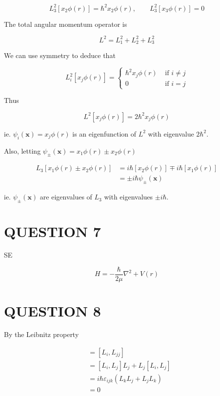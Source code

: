 \documentclass[a4paper]{article}
\begin{document}
\[ L_{3}^{2}[ x_{2} \phi(r) ] = \hbar^{2} x_{2} \phi(r), \qquad L_{3}^{2}[x_{3}\phi(r)] = 0   \]

The total angular momentum operator is 

\[ L^{2} = L_{1}^{2} + L_{2}^{2} + L_{3}^{2} \]

We can use symmetry to deduce that

\[ L_{i}^{2}[ x_{j} \phi(r) ] = \begin{cases} \hbar^{2} x_{j} \phi(r)  & \text{ if } i \neq j \\ 0 &  \text{ if } i = j \end{cases}  \]

Thus

\[ L^{2}[ x_{j} \phi(r) ] = 2  \hbar^{2} x_{j} \phi(r) \]

ie. $ \psi_{i}(\mathbf{x}) = x_{j} \phi(r) $ is an eigenfunction of $ L^{2}  $ with eigenvalue $ 2\hbar^{2} $.

Also, letting $ \psi_{\pm}(\mathbf{x}) = x_{1} \phi(r) \pm  x_{2} \phi(r) $

\begin{align*}
L_{3} [ x_{1} \phi(r) \pm  x_{2} \phi(r) ] & = i \hbar [x_{2} \phi(r) ] \mp i \hbar [x_{1} \phi(r) ] \\
& = \pm i \hbar \psi_{\pm}(\mathbf{x})
\end{align*}

ie. $ \psi_{\pm}(\mathbf{x}) $ are eigenvalues of $ L_{3} $ with eigenvalues $ \pm i \hbar $.






                                                     
                                                                    
\section{QUESTION 7}

SE 

\[ H = - \frac{\hbar}{2 \mu } \nabla^{2} + V(r) \]

\section{QUESTION 8}

By the Leibnitz property

\begin{align*}
[L_{i},\mathbf{L}] & = [L_{i},L_{jj}]\\
& =  [L_{i},L_{j}] L_{j} + L_{j}[L_{i},L_{j}]  \\
& = i \hbar \varepsilon_{ijk} (L_{k}L_{j} + L_{j}L_{k}  ) \\
& = 0
\end{align*}
\end{document}
